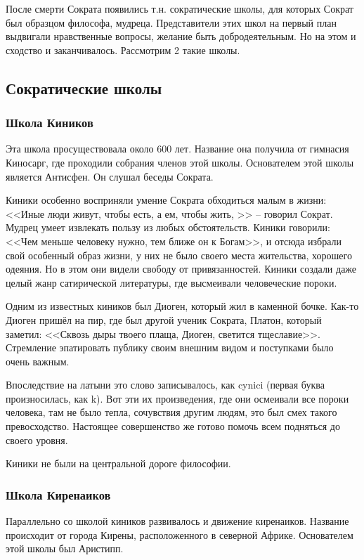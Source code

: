 \documentclass[a4paper, 12pt]{book} %
\begin{document}
После смерти Сократа появились т.н. сократические школы, для которых Сократ был образцом философа, мудреца. Представители этих школ на первый план выдвигали нравственные вопросы, желание быть добродеятельным. Но на этом и сходство и заканчивалось. Рассмотрим 2 такие школы.

\subsection{Сократические школы}
\subsubsection{Школа Киников}
Эта школа просуществовала около 600 лет. Название она получила от гимнасия Киносарг, где проходили собрания членов этой школы. Основателем этой школы является Антисфен. Он слушал беседы Сократа.

Киники особенно восприняли умение Сократа обходиться малым в жизни: <<Иные люди живут, чтобы есть, а ем, чтобы жить, >> -- говорил Сократ. Мудрец умеет извлекать пользу из любых обстоятельств. Киники говорили: <<Чем меньше человеку нужно, тем ближе он к Богам>>, и отсюда избрали свой особенный образ жизни, у них не было своего места жительства, хорошего одеяния. Но в этом они видели свободу от привязанностей. Киники создали даже целый жанр сатирической литературы, где высмеивали человеческие пороки.

Одним из известных киников был Диоген, который жил в каменной бочке. Как-то Диоген пришёл на пир, где был другой ученик Сократа, Платон, который заметил: <<Сквозь дыры твоего плаща, Диоген, светится тщеславие>>. Стремление эпатировать публику своим внешним видом и поступками было очень важным. 

Впоследствие на латыни это слово записывалось, как cynici (первая буква произносилась, как k). Вот эти их произведения, где они осмеивали все пороки человека, там не было тепла, сочувствия другим людям, это был смех такого превосходство. Настоящее совершенство же готово помочь всем подняться до своего уровня.

Киники не были на центральной дороге философии. 

\subsubsection{Школа Киренаиков}
Параллельно со школой киников развивалось и движение киренаиков. Название происходит от города Кирены, расположенного в северной Африке. Основателем этой школы был Аристипп. 
\end{document}

